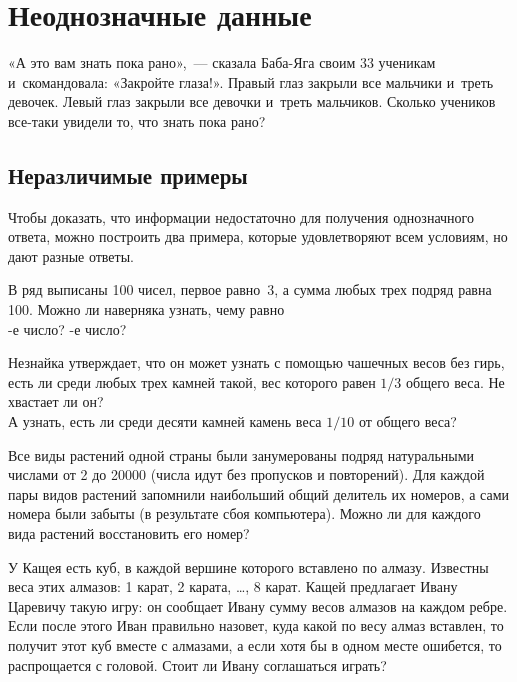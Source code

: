 
\section*{Неоднозначные данные}



\begin{flushright}
«А это вам знать пока рано»,~— сказала Баба-Яга своим 33 ученикам
и~скомандовала:
«Закройте глаза!».
Правый глаз закрыли все мальчики и~треть девочек.
Левый глаз закрыли все девочки и~треть мальчиков.
Сколько учеников все-таки увидели то, что знать пока рано?
\end{flushright}

\subsection*{Неразличимые примеры}

Чтобы доказать, что информации недостаточно для получения однозначного ответа,
можно построить два примера, которые удовлетворяют всем условиям, но дают
разные ответы.

\begin{problems}

\item
В ряд выписаны 100 чисел, первое равно~3, а сумма любых трех подряд равна 100.
Можно ли наверняка узнать, чему равно
\\
-е число?
\quad
{}-е число?

\item
\subproblem
Незнайка утверждает, что он может узнать с помощью чашечных весов без гирь,
есть ли среди любых трех камней такой, вес которого равен $1/3$ общего веса.
Не хвастает ли он?
\\
\subproblem
А узнать, есть ли среди десяти камней камень веса $1/10$ от общего веса?

\item
Все виды растений одной страны были занумерованы подряд натуральными числами
от 2 до 20000 (числа идут без пропусков и повторений).
Для каждой пары видов растений запомнили наибольший общий делитель их номеров,
а сами номера были забыты (в результате сбоя компьютера).
Можно ли для каждого вида растений восстановить его номер?

\item
У Кащея есть куб, в каждой вершине которого вставлено по алмазу.
Известны веса этих алмазов: 1 карат, 2 карата, \ldots, 8 карат.
Кащей предлагает Ивану Царевичу такую игру: он сообщает Ивану сумму весов
алмазов на каждом ребре.
Если после этого Иван правильно назовет, куда какой по весу алмаз вставлен,
то получит этот куб вместе с алмазами, а если хотя бы в одном месте ошибется,
то распрощается с головой.
Стоит ли Ивану соглашаться играть?

\end{problems}

